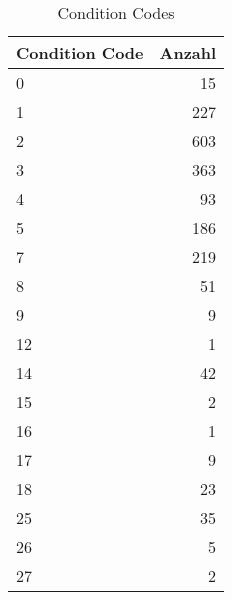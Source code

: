 \begin{table}[t]
    \caption{Condition Codes}
    \label{Condition Codes}
    \centering
    \small
    \begin{tabular}{l r}
        \toprule
        Condition Code & Anzahl\\
        \midrule
        0 & 15\\
        1 & 227\\
        2 & 603\\
        3 & 363\\
        4 & 93\\
        5 & 186\\
        7 & 219\\
        8 & 51\\
        9 & 9\\
        12 & 1\\
        14 & 42\\
        15 & 2\\
        16 & 1\\
        17 & 9\\
        18 & 23\\
        25 & 35\\
        26 & 5\\
        27 & 2\\
        \bottomrule
    \end{tabular}
\end{table}